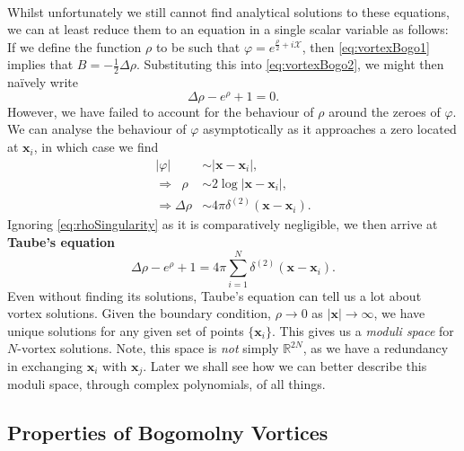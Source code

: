 \documentclass[11pt, fleqn]{article}
\begin{document}
\paragraph{} Whilst unfortunately we still cannot find analytical solutions to these equations, we can at least reduce them to an equation in a single scalar variable as follows: If we define the function $ \rho $ to be such that $ \varphi = e^{\tfrac{\rho}{2} + i\mathcal{X} } $, then \eqref{eq:vortexBogo1} implies that $ B = -\tfrac{1}{2} \Delta \rho $. Substituting this into \eqref{eq:vortexBogo2}, we might then na\"ively write
	\begin{equation}\label{key}
		\Delta \rho - e^\rho + 1 = 0.
	\end{equation}
However, we have failed to account for the behaviour of $ \rho $ around the zeroes of $ \varphi $. We can analyse the behaviour of $ \varphi $ asymptotically as it approaches a zero located at $ \mathbf{x}_i $, in which case we find
	\begin{subequations}
			\begin{align}
						|\varphi| 		&\sim | \mathbf{x} - \mathbf{x}_i |, \\
				\Rightarrow \phantom{a} \rho 	&\sim 2 \log | \mathbf{x} - \mathbf{x}_i |, \label{eq:rhoSingularity} \\
				\Rightarrow \Delta\rho &\sim 4 \pi \delta^{(2)} (\mathbf{x} - \mathbf{x}_i ).
			\end{align}
	\end{subequations}
Ignoring \eqref{eq:rhoSingularity} as it is comparatively negligible, we then arrive at \textbf{Taube's equation}
	\begin{equation}\label{eq:Taube}
		\Delta \rho - e^\rho + 1 = 4 \pi \sum_{i=1}^N \delta^{(2)} ( \textbf{x} - \textbf{x}_i ) .
	\end{equation}
Even without finding its solutions, Taube's equation can tell us a lot about vortex solutions. Given the boundary condition, $ \rho \to 0 $ as $ | \mathbf{x} | \to \infty $, we have unique solutions for any given set of points $ \{ \mathbf{x}_i \} $. This gives us a \textit{moduli space} for $ N $-vortex solutions. Note, this space is \textit{not} simply $ \mathbb{R}^{2N} $, as we have a redundancy in exchanging $ \mathbf{x}_i $ with $ \mathbf{x}_j $. Later we shall see how we can better describe this moduli space, through complex polynomials, of all things.

\subsection{Properties of Bogomolny Vortices}
\end{document}
